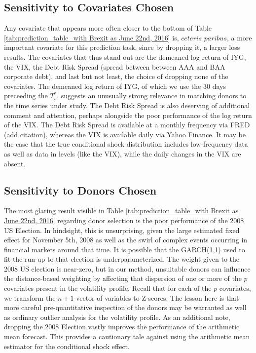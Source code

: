 \documentclass[11pt,3p,review,authoryear]{elsarticle}
\theoremstyle{definition}
\begin{document}
\subsection{Sensitivity to Covariates Chosen}
Any covariate that appears more often closer to the bottom of Table \ref{tab:prediction_table_with Brexit as June 22nd, 2016} is, $\textit{ceteris paribus}$, a more important covariate for this prediction task, since by dropping it, a larger loss results.  The covariates that thus stand out are the demeaned log return of IYG, the VIX, the Debt Risk Spread (spread between between AAA and BAA corporate debt), and last but not least, the choice of dropping none of the covariates.  The demeaned log return of IYG, of which we use the 30 days preceeding the $T_{i}^{*}$, suggests an unusually strong relevance in matching donors to the time series under study.  The Debt Risk Spread is also deserving of additional comment and attention, perhaps alongside the poor performance of the log return of the VIX.  The Debt Risk Spread is available at a monthly frequency via FRED (add citation), whereas the VIX is available daily via Yahoo Finance.  It may be the case that the true conditional shock distribution includes low-frequency data as well as data in levels (like the VIX), while the daily changes in the VIX are absent.


\subsection{Sensitivity to Donors Chosen}

The most glaring result visible in Table \ref{tab:prediction_table_with Brexit as June 22nd, 2016} regarding donor selection is the poor performance of the 2008 US Election.  In hindsight, this is unsurprising, given the large estimated fixed effect for November 5th, 2008 as well as the swirl of complex events occurring in financial markets around that time.  It is possible that the GARCH(1,1) used to fit the run-up to that election is underparameterized.  The weight given to the 2008 US election is near-zero, but in our method, unsuitable donors can influence the distance-based weighting by affecting that dispersion of one or more of the $p$ covariates present in the volatility profile.  Recall that for each of the $p$ covariates, we transform the $n+1$-vector of variables to Z-scores.  The lesson here is that more careful pre-quantitative inspection of the donors may be warranted as well as ordinary outlier analysis for the volatility profile.  As an additional note, dropping the 2008 Election vastly improves the performance of the arithmetic mean forecast.  This provides a cautionary tale against using the arithmetic mean estimator for the conditional shock effect.  
\end{document}

